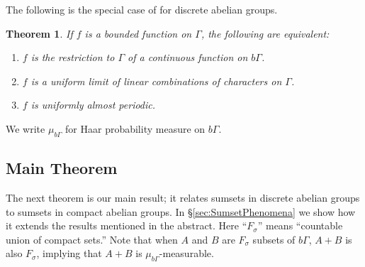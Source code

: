 \documentclass[12pt]{amsart} \usepackage{amsmath,centernot,amssymb,leftindex}
\newtheorem{theorem}{Theorem}
\numberwithin{theorem}{section}
\numberwithin{equation}{section}
\theoremstyle{definition}
\begin{document}
The following is the special case of \cite[ Theorem 4.79]{Folland_CourseInAHA} for discrete abelian groups.

\begin{theorem}\label{th:BohrCompactificationAndAP} %
	If $f$ is a bounded  function on $\Gamma$, the following are equivalent: 
	\begin{enumerate}
		\item[a.]  $f$ is the restriction to $\Gamma$ of a continuous function on $b\Gamma$.
		\item[b.]  $f$ is a uniform limit of linear combinations of characters on $\Gamma$.
		\item[c.]  $f$ is uniformly almost periodic.	
	\end{enumerate}
\end{theorem}
We write $\mu_{b\Gamma}$ for Haar probability measure on $b\Gamma$.

\subsection{Main Theorem}	
	The next theorem is our main result; it relates sumsets in   discrete abelian groups to sumsets in compact abelian groups.  In \S\ref{sec:SumsetPhenomena} we show how it extends the results mentioned in the abstract.  Here ``$F_{\sigma}$'' means ``countable union of compact sets.''  Note that when $A$ and $B$ are $F_{\sigma}$ subsets of $b\Gamma$, $A+B$ is also $F_{\sigma}$, implying that $A+B$ is $\mu_{b\Gamma}$-measurable.
	
\end{document}
